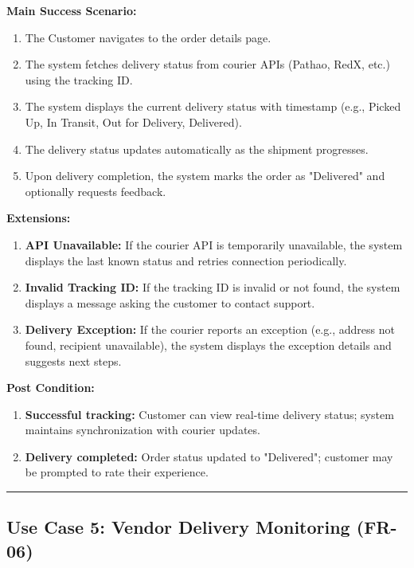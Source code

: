 \textbf{Main Success Scenario:}
\begin{enumerate}
    \item The Customer navigates to the order details page.
    \item The system fetches delivery status from courier APIs (Pathao, RedX, etc.) using the tracking ID.
    \item The system displays the current delivery status with timestamp (e.g., Picked Up, In Transit, Out for Delivery, Delivered).
    \item The delivery status updates automatically as the shipment progresses.
    \item Upon delivery completion, the system marks the order as "Delivered" and optionally requests feedback.
\end{enumerate}

\textbf{Extensions:}
\begin{enumerate}
    \item[2a.] \textbf{API Unavailable:} If the courier API is temporarily unavailable, the system displays the last known status and retries connection periodically.
    \item[2b.] \textbf{Invalid Tracking ID:} If the tracking ID is invalid or not found, the system displays a message asking the customer to contact support.
    \item[3a.] \textbf{Delivery Exception:} If the courier reports an exception (e.g., address not found, recipient unavailable), the system displays the exception details and suggests next steps.
\end{enumerate}

\textbf{Post Condition:}
\begin{enumerate}
    \item \textbf{Successful tracking:} Customer can view real-time delivery status; system maintains synchronization with courier updates.
    \item \textbf{Delivery completed:} Order status updated to "Delivered"; customer may be prompted to rate their experience.
\end{enumerate}

\vspace{0.5cm}
\hrule
\vspace{0.5cm}

\subsection*{Use Case 5: Vendor Delivery Monitoring (FR-06)}

